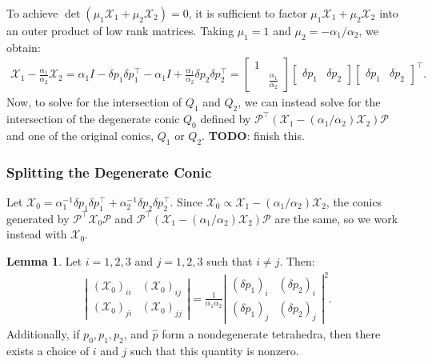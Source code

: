 \documentclass{article}
\theoremstyle{definition}
\newtheorem{lemma}{Lemma}
\begin{document}
To achieve $\det(\mu_1 \mathcal{X}_1 + \mu_2 \mathcal{X}_2) = 0$, it is sufficient to
factor $\mu_1 \mathcal{X}_1 + \mu_2 \mathcal{X}_2$ into an outer product of low rank
matrices. Taking $\mu_1 = 1$ and $\mu_2 = -\alpha_1/\alpha_2$, we
obtain:
\begin{align*}
  \mathcal{X}_1 - \frac{\alpha_1}{\alpha_2} \mathcal{X}_2 = \alpha_1 I - \delta p_1 \delta p_1^\top - \alpha_1 I + \frac{\alpha_1}{\alpha_2} \delta p_2 \delta p_2^\top = \begin{bmatrix} 1 & \\ & \frac{\alpha_1}{\alpha_2} \end{bmatrix} \begin{bmatrix} \delta p_1 & \delta p_2 \end{bmatrix} \begin{bmatrix} \delta p_1 & \delta p_2 \end{bmatrix}^\top.
\end{align*}
Now, to solve for the intersection of $Q_1$ and $Q_2$, we can instead
solve for the intersection of the degenerate conic $Q_0$ defined by
$\mathcal{P}^\top {(\mathcal{X}_1 - (\alpha_1/\alpha_2) \mathcal{X}_2)} \mathcal{P}$ and
one of the original conics, $Q_1$ or $Q_2$. \textbf{TODO}: finish
this.

\subsubsection*{Splitting the Degenerate Conic}

Let
$\mathcal{X}_0 = \alpha_1^{-1} \delta p_1 \delta p_1^\top +
\alpha_2^{-1} \delta p_2 \delta p_2^\top$. Since
$\mathcal{X}_0 \propto \mathcal{X}_1 - (\alpha_1/\alpha_2)
\mathcal{X}_2$, the conics generated by
$\mathcal{P}^\top \mathcal{X}_0 \mathcal{P}$ and
$\mathcal{P}^\top {(\mathcal{X}_1 - (\alpha_1/\alpha_2)
  \mathcal{X}_2)} \mathcal{P}$ are the same, so we work instead with
$\mathcal{X}_0$.

\begin{lemma}
  Let $i = 1, 2, 3$ and $j = 1, 2, 3$ such that $i \neq j$. Then:
  \begin{align*}
    \left|\begin{matrix}
      {(\mathcal{X}_0)}_{ii} & {(\mathcal{X}_0)}_{ij} \\
      {(\mathcal{X}_0)}_{ji} & {(\mathcal{X}_0)}_{jj}
    \end{matrix}\right| = \frac{1}{\alpha_1 \alpha_2} \left|\begin{matrix}
      {(\delta p_1)}_i & {(\delta p_2)}_i \\
      {(\delta p_1)}_j & {(\delta p_2)}_j
    \end{matrix}\right|^2.
  \end{align*}
  Additionally, if $p_0, p_1, p_2$, and $\hat{p}$ form a nondegenerate
  tetrahedra, then there exists a choice of $i$ and $j$ such that this
  quantity is nonzero.
\end{lemma}
\end{document}
